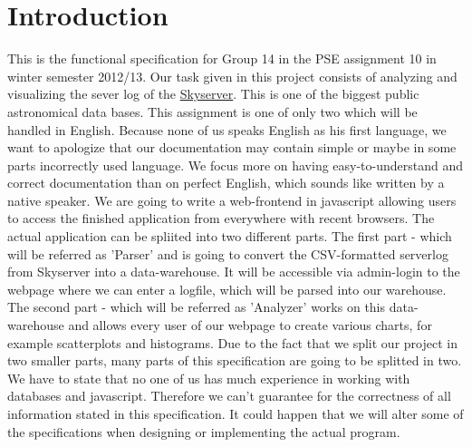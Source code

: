 \section*{Introduction}
This is the functional specification for Group 14 in the PSE assignment 10 
in winter semester 2012/13. 
 Our task given in this project consists of
analyzing and visualizing the sever log of the \href{http://skyserver.sdss.org/public/en/}{Skyserver}.
This is one of the biggest public astronomical data bases.
This assignment is one of only two which will be handled 
in English.
Because none of us speaks English as his first language, 
we want to apologize that our documentation may contain simple 
or maybe in some parts incorrectly used language. We focus more on 
having easy-to-understand and correct documentation 
than on perfect English, which sounds like written by a native speaker.
\newline\newline
We are going to write a web-frontend in javascript allowing users 
to access the finished application from everywhere
with recent browsers. The actual application can be spliited into two 
different parts. The first part - which will be referred as 'Parser' and is going to convert the CSV-formatted 
serverlog from Skyserver into a data-warehouse. It will
be accessible via admin-login to the webpage where we can enter a 
logfile, which will be parsed into our warehouse.
The second part - which will be referred as 'Analyzer' works on this data-warehouse 
and allows every user of our webpage to create various charts, 
for example scatterplots and histograms.
Due to the fact that we split our project in two smaller parts, 
many parts of this specification are going to be splitted in two.
\newline
\newline
We have to state that no one of us has much experience in working 
with databases and javascript.
Therefore we can't guarantee for the correctness of all information 
stated in this specification.
It could happen that we will alter some of the specifications when designing or 
implementing the actual program.

